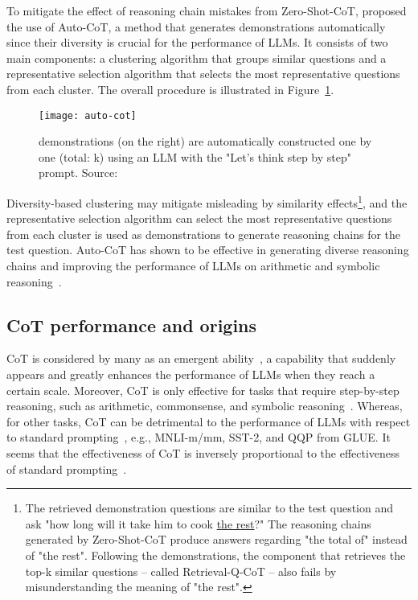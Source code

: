 To mitigate the effect of reasoning chain mistakes from Zero-Shot-CoT, \textcite{zhang2022automatic} proposed the use of Auto-CoT, a method that generates demonstrations automatically since their diversity is crucial for the performance of LLMs.
It consists of two main components: a clustering algorithm that groups similar questions and a representative selection algorithm that selects the most representative questions from each cluster.
The overall procedure is illustrated in Figure~\ref{fig:auto-cot}.
\begin{figure}[h!]
	\centering
	\texttt{[image: auto-cot]}
	\caption{demonstrations (on the right) are automatically constructed one by one (total: k) using an LLM with the "Let’s think step by step" prompt. Source: \textcite{zhang2022automatic}}
	\label{fig:auto-cot}
\end{figure}
Diversity-based clustering may mitigate misleading by similarity effects\footnote{The retrieved demonstration questions are similar to the test question and ask "how long will it take him to cook \underline{the rest}?" The reasoning chains generated by Zero-Shot-CoT produce answers regarding "the total of" instead of "the rest". Following the demonstrations, the component that retrieves the top-k similar questions -- called Retrieval-Q-CoT -- also fails by misunderstanding the meaning of "the rest".}, and the representative selection algorithm can select the most representative questions from each cluster is used as demonstrations to generate reasoning chains for the test question.
Auto-CoT has shown to be effective in generating diverse reasoning chains and improving the performance of LLMs on arithmetic and symbolic reasoning~\cite{zhang2022automatic}.

\subsection{CoT performance and origins}
\label{subsec:cot-performance}

CoT is considered by many as an emergent ability~\cite{wei2022emergent}, a capability that suddenly appears and greatly enhances the performance of LLMs when they reach a certain scale.
Moreover, CoT is only effective for tasks that require step-by-step reasoning, such as arithmetic, commonsense, and symbolic reasoning~\cite{wei2022chain, miao2021diverse, talmor2019commonsenseqa}.
Whereas, for other tasks, CoT can be detrimental to the performance of LLMs with respect to standard prompting~\cite{wang2022rationale}, e.g., MNLI-m/mm, SST-2, and QQP from GLUE\cite{wang2018glue}.
It seems that the effectiveness of CoT is inversely proportional to the effectiveness of standard prompting~\cite{wei2022chain}.

